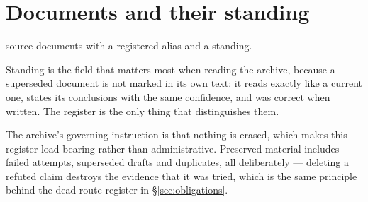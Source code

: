 \section{Documents and their standing}
\label{app:documents}

\AliasCount{} source documents with a registered alias and a standing.

Standing is the field that matters most when reading the archive,
because a superseded document is not marked in its own text: it reads
exactly like a current one, states its conclusions with the same
confidence, and was correct when written. The register is the only
thing that distinguishes them.

The archive's governing instruction is that nothing is erased, which
makes this register load-bearing rather than administrative. Preserved
material includes failed attempts, superseded drafts and duplicates,
all deliberately --- deleting a refuted claim destroys the evidence
that it was tried, which is the same principle behind the dead-route
register in \S\ref{sec:obligations}.



